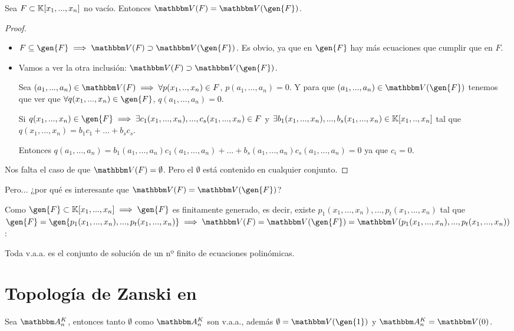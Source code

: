 \begin{prop}
	Sea $F \subset \mathbb{K}[x_1,...,x_n]$ no vacío. Entonces $\V(F)=\V(\gen{F})$.
\end{prop} 

\begin{proof}
	\begin{itemize}
		\item $F \subseteq \gen{F} \implies \V(F) \supset \V(\gen{F})$. Es obvio, ya que en $\gen{F}$ hay más ecuaciones que cumplir que en $F$.
		\item Vamos a ver la otra inclusión: $\V(F) \supset \V(\gen{F})$.
		
		Sea $(a_1,...,a_n) \in \V(F) \implies \forall p(x_1,..,x_n) \in F$, $p(a_1,...,a_n)=0$. Y para que $(a_1,...,a_n) \in \V(\gen{F})$ tenemos que ver que $\forall q(x_1,...,x_n)\in \gen{F}$, $q(a_1,...,a_n)=0$.
		
		Si $q(x_1,...,x_n)\in \gen{F} \implies \exists c_1(x_1,...,x_n),...,c_s(x_1,...,x_n) \in F$ y $\exists b_1(x_1,...,x_n),...,b_s(x_1,...,x_n) \in \mathbb{K}[x_1,..,x_n]$ tal que $q(x_1,...,x_n)=b_1c_1+...+b_sc_s$.
		
		Entonces $q(a_1,...,a_n)=b_1(a_1,...,a_n)c_1(a_1,...,a_n)+...+b_s(a_1,...,a_n)c_s(a_1,...,a_n) = 0$  ya que $c_i=0$.
	\end{itemize}
	
	Nos falta el caso de que $\V(F)=\emptyset$. Pero el $\emptyset$ está contenido en cualquier conjunto.
\end{proof}

Pero... ¿por qué es interesante que $\V(F)=\V(\gen{F})$?

Como $\gen{F}\subset \K[x_1,...,x_n] \implies \gen{F}$ es finitamente generado, es decir, existe $p_1(x_1,...,x_n),...,p_t(x_1,...,x_n)$ tal que $\gen{F} = \gen{p_1(x_1,...,x_n),...,p_t(x_1,...,x_n)} \implies \V(F)=\V(\gen{F})=\V(p_1(x_1,...,x_n),...,p_t(x_1,...,x_n))$:

\obs Toda v.a.a. es el conjunto de solución de un nº finito de ecuaciones polinómicas.

\section{Topología de Zanski en \Akn}
Sea $\Akn$, entonces tanto $\emptyset$ como $\Akn$ son v.a.a., además $\emptyset=\V(\gen{1})$ y $\Akn=\V(0)$.


